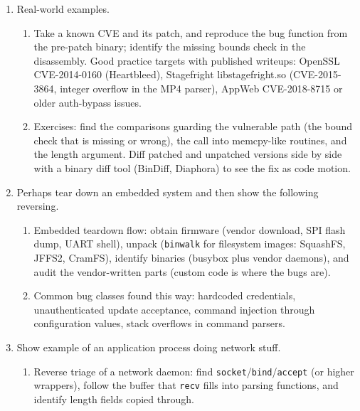 \documentclass[12pt]{Training}
\begin{document}
\begin{enumerate}
\begin{enumerate}
        \item Follow the call convention: \lstinline{bl} writes the return address into x30 (LR); \lstinline{ret} jumps via x30. That is why overwriting the saved x30 slot in a stack buffer overflow redirects execution on ARM64 the same way overwriting the saved return address does on x86.
    \end{enumerate}
    \item Real-world examples.
    \begin{enumerate}
        \item Take a known CVE and its patch, and reproduce the bug function from the pre-patch binary; identify the missing bounds check in the disassembly. Good practice targets with published writeups: OpenSSL CVE-2014-0160 (Heartbleed), Stagefright libstagefright.so (CVE-2015-3864, integer overflow in the MP4 parser), AppWeb CVE-2018-8715 or older auth-bypass issues.
        \item Exercises: find the comparisons guarding the vulnerable path (the bound check that is missing or wrong), the call into memcpy-like routines, and the length argument. Diff patched and unpatched versions side by side with a binary diff tool (BinDiff, Diaphora) to see the fix as code motion.
    \end{enumerate}
    \item Perhaps tear down an embedded system and then show the following reversing.
    \begin{enumerate}
        \item Embedded teardown flow: obtain firmware (vendor download, SPI flash dump, UART shell), unpack (\lstinline{binwalk} for filesystem images: SquashFS, JFFS2, CramFS), identify binaries (busybox plus vendor daemons), and audit the vendor-written parts (custom code is where the bugs are).
        \item Common bug classes found this way: hardcoded credentials, unauthenticated update acceptance, command injection through configuration values, stack overflows in command parsers.
    \end{enumerate}
    \item Show example of an application process doing network stuff.
    \begin{enumerate}
        \item Reverse triage of a network daemon: find \lstinline{socket}/\lstinline{bind}/\lstinline{accept} (or higher wrappers), follow the buffer that \lstinline{recv} fills into parsing functions, and identify length fields copied through.

\end{enumerate}
\end{enumerate}
\end{document}
